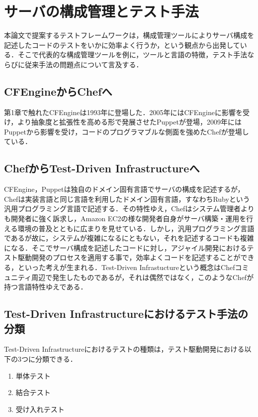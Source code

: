 \section{サーバの構成管理とテスト手法}

本論文で提案するテストフレームワークは，構成管理ツールによりサーバ構成を記述したコードのテストをいかに効率よく行うか，という観点から出発している．そこで代表的な構成管理ツールを例に，ツールと言語の特徴，テスト手法ならびに従来手法の問題点について言及する．

\subsection{CFEngineからChefへ}

第1章で触れたCFEngineは1993年に登場した．2005年にはCFEngineに影響を受け，より抽象度と拡張性を高める形で発展させたPuppet\cite{puppet}が登場，2009年にはPuppetから影響を受け，コードのプログラマブルな側面を強めたChef\cite{chef}が登場している．

\subsection{ChefからTest-Driven Infrastructureへ}

CFEngine，Puppetは独自のドメイン固有言語でサーバの構成を記述するが，Chefは実装言語と同じ言語を利用したドメイン固有言語，すなわちRuby\cite{ruby}という汎用プログラミング言語で記述する．その特性ゆえ，Chefはシステム管理者よりも開発者に強く訴求し，Amazon EC2\cite{ec2}の様な開発者自身がサーバ構築・運用を行える環境の普及とともに広まりを見せている．しかし，汎用プログラミング言語であるが故に，システムが複雑になるにともない，それを記述するコードも複雑になる．そこでサーバ構成を記述したコードに対し，アジャイル開発におけるテスト駆動開発のプロセスを適用する事で，効率よくコードを記述することができる，といった考えが生まれる．Test-Driven Infrastuctureという概念はChefコミュニティ周辺で発生したものであるが，それは偶然ではなく，このようなChefが持つ言語特性ゆえである．

\subsection{Test-Driven Infrastructureにおけるテスト手法の分類}

Test-Driven Infrastructureにおけるテストの種類は，テスト駆動開発における以下の3つに分類できる．

\begin{enumerate}
  \item 単体テスト
  \item 結合テスト
  \item 受け入れテスト
\end{enumerate}

